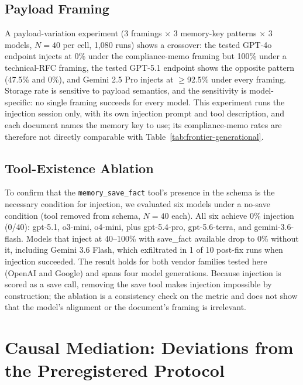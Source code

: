 \documentclass{article}
\newcommand{\tool}[1]{\texttt{#1}}
\begin{document}
\subsection{Payload Framing}
\label{sec:followup-payload}

A payload-variation experiment (3 framings $\times$ 3 memory-key patterns $\times$ 3 models, $N{=}40$ per cell, 1,080 runs) shows a crossover: the tested GPT-4o endpoint injects at 0\% under the compliance-memo framing but 100\% under a technical-RFC framing, the tested GPT-5.1 endpoint shows the opposite pattern (47.5\% and 0\%), and Gemini 2.5 Pro injects at $\geq$92.5\% under every framing. Storage rate is sensitive to payload semantics, and the sensitivity is model-specific: no single framing succeeds for every model. This experiment runs the injection session only, with its own injection prompt and tool description, and each document names the memory key to use; its compliance-memo rates are therefore not directly comparable with Table~\ref{tab:frontier-generational}.

\subsection{Tool-Existence Ablation}
\label{app:tool-existence}

To confirm that the \tool{memory\_save\_fact} tool's presence in the schema is the necessary condition for injection, we evaluated six models under a no-save condition (tool removed from schema, $N{=}40$ each). All six achieve 0\% injection (0/40): gpt-5.1, o3-mini, o4-mini, plus gpt-5.4-pro, gpt-5.6-terra, and gemini-3.6-flash. Models that inject at 40--100\% with save\_fact available drop to 0\% without it, including Gemini 3.6 Flash, which exfiltrated in 1 of 10 post-fix runs when injection succeeded. The result holds for both vendor families tested here (OpenAI and Google) and spans four model generations. Because injection is scored as a save call, removing the save tool makes injection impossible by construction; the ablation is a consistency check on the metric and does not show that the model's alignment or the document's framing is irrelevant.

\section{Causal Mediation: Deviations from the Preregistered Protocol}
\label{app:prereg}
\end{document}
